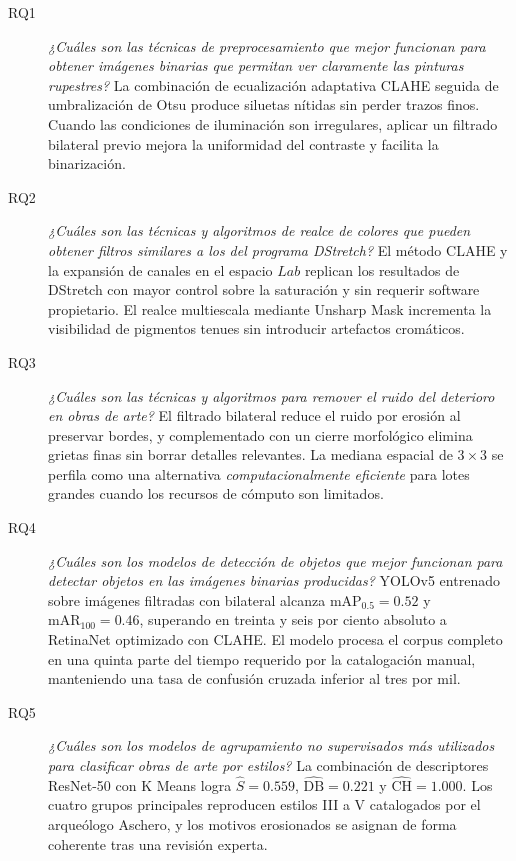 \begin{description}
  \item[RQ1] \emph{¿Cuáles son las técnicas de preprocesamiento que mejor funcionan para obtener imágenes binarias que permitan ver claramente las pinturas rupestres?}
             La combinación de ecualización adaptativa CLAHE seguida de umbralización de Otsu produce siluetas nítidas sin perder trazos finos.
             Cuando las condiciones de iluminación son irregulares, aplicar un filtrado bilateral previo mejora la uniformidad del contraste y facilita la binarización.

  \item[RQ2] \emph{¿Cuáles son las técnicas y algoritmos de realce de colores que pueden obtener filtros similares a los del programa DStretch?}
             El método CLAHE y la expansión de canales en el espacio \(\textit{L}\!a\!b\) replican los resultados de DStretch con mayor control sobre la saturación y sin requerir software propietario.
             El realce multiescala mediante Unsharp Mask incrementa la visibilidad de pigmentos tenues sin introducir artefactos cromáticos.

  \item[RQ3] \emph{¿Cuáles son las técnicas y algoritmos para remover el ruido del deterioro en obras de arte?}
            El filtrado bilateral reduce el ruido por erosión al preservar bordes, y complementado con un cierre morfológico elimina grietas finas sin borrar detalles relevantes.
            La mediana espacial de \(3\times 3\) se perfila como una alternativa \textit{computacionalmente eficiente} para lotes grandes cuando los recursos de cómputo son limitados.


  \item[RQ4] \emph{¿Cuáles son los modelos de detección de objetos que mejor funcionan para detectar objetos en las imágenes binarias producidas?}
             YOLOv5 entrenado sobre imágenes filtradas con bilateral alcanza \(\mathrm{mAP}_{0.5}=0.52\) y \(\mathrm{mAR}_{100}=0.46\), superando en treinta y seis por ciento absoluto a RetinaNet optimizado con CLAHE.
             El modelo procesa el corpus completo en una quinta parte del tiempo requerido por la catalogación manual, manteniendo una tasa de confusión cruzada inferior al tres por mil.

  \item[RQ5] \emph{¿Cuáles son los modelos de agrupamiento no supervisados más utilizados para clasificar obras de arte por estilos?}
             La combinación de descriptores ResNet-50 con K Means logra \(\widehat{S}=0.559\), \(\widehat{\mathrm{DB}}=0.221\) y \(\widehat{\mathrm{CH}}=1.000\).
             Los cuatro grupos principales reproducen estilos III a V catalogados por el arqueólogo Aschero, y los motivos erosionados se asignan de forma coherente tras una revisión experta.
\end{description}

